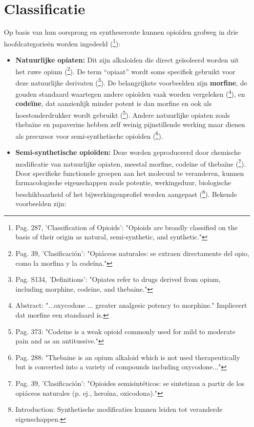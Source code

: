 \documentclass[11pt, a4paper]{report} %
\begin{document}
\section{Classificatie}
Op basis van hun oorsprong en syntheseroute kunnen opioïden grofweg in drie hoofdcategorieën worden ingedeeld (\cite{Gupta2010ChemistryOpioids}\footnote{Pag. 287, 'Classification of Opioids': "Opioids are broadly classified on the basis of their origin as natural, semi-synthetic, and synthetic."}):
\begin{itemize}
    \item \textbf{Natuurlijke opiaten:} Dit zijn alkaloïden die direct geïsoleerd worden uit het ruwe opium (\cite{SciELO2020Opioids}\footnote{Pag. 39, 'Clasificación': "Opiáceos naturales: se extraen directamente del opio, como la morfina y la codeína."}). De term \enquote{opiaat} wordt soms specifiek gebruikt voor deze natuurlijke derivaten (\cite{Trescot2008OpioidPharm}\footnote{Pag. S134, 'Definitions': "Opiates refer to drugs derived from opium, including morphine, codeine, and thebaine."}). De belangrijkste voorbeelden zijn \textbf{morfine}, de gouden standaard waartegen andere opioïden vaak worden vergeleken (\cite{Riley2008OxycodoneReview}\footnote{Abstract: "...oxycodone ... greater analgesic potency to morphine." Impliceert dat morfine een standaard is.}), en \textbf{codeïne}, dat aanzienlijk minder potent is dan morfine en ook als hoestonderdrukker wordt gebruikt (\cite{Kalso2004OpioidsChronicNonCancerPain}\footnote{Pag. 373: "Codeine is a weak opioid commonly used for mild to moderate pain and as an antitussive."}). Andere natuurlijke opiaten zoals thebaïne en papaverine hebben zelf weinig pijnstillende werking maar dienen als precursor voor semi-synthetische opioïden (\cite{Gupta2010ChemistryOpioids}\footnote{Pag. 288: "Thebaine is an opium alkaloid which is not used therapeutically but is converted into a variety of compounds including oxycodone..."}).
    \item \textbf{Semi-synthetische opioïden:} Deze worden geproduceerd door chemische modificatie van natuurlijke opiaten, meestal morfine, codeïne of thebaïne (\cite{SciELO2020Opioids}\footnote{Pag. 39, 'Clasificación': "Opioides semisintéticos: se sintetizan a partir de los opiáceos naturales (p. ej., heroína, oxicodona)."}). Door specifieke functionele groepen aan het molecuul te veranderen, kunnen farmacologische eigenschappen zoals potentie, werkingsduur, biologische beschikbaarheid of het bijwerkingenprofiel worden aangepast (\cite{Feng2023MLOpioidInteractome}\footnote{Introduction: Synthetische modificaties kunnen leiden tot veranderde eigenschappen.}). Bekende voorbeelden zijn:

\end{itemize}
\end{document}
